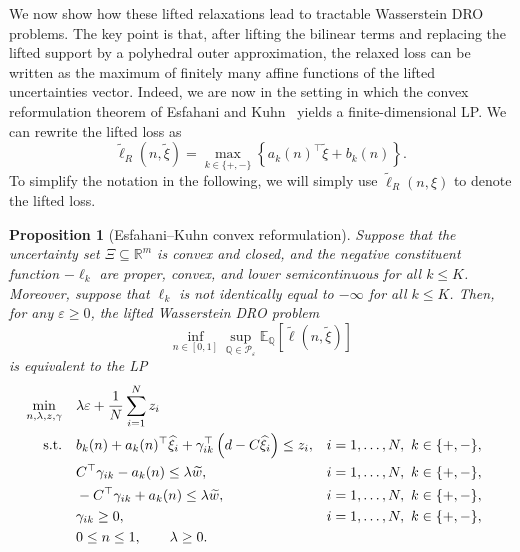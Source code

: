 \documentclass[11pt]{article}
\theoremstyle{plain}
\newtheorem{proposition}{Proposition}
\theoremstyle{definition}
\begin{document}
We now show how these lifted relaxations lead to tractable Wasserstein DRO problems. 
The key point is that, after lifting the bilinear terms and replacing the lifted support by a polyhedral outer approximation, the relaxed loss can be written as the maximum of finitely many affine functions of the lifted uncertainties vector. 
Indeed, we are now in the setting in which the convex reformulation theorem of Esfahani and Kuhn~\cite{EsfahaniKuhn2018} yields a finite-dimensional LP.
We can rewrite the lifted loss as
\begin{equation}\label{eq:max-affine-loss}
    \widetilde\ell_R(n,\widetilde\xi)
    =
    \max_{k\in\{+,-\}}
    \left\{
        a_k(n)^\top\widetilde\xi+b_k(n)
    \right\}.
\end{equation}
To simplify the notation in the following, we will simply use $\widetilde\ell_R(n,\xi)$ to denote the lifted loss.

\begin{proposition}[Esfahani--Kuhn convex reformulation]
\label{prop:convex-reformulation-kuhn}
Suppose that the uncertainty set $\Xi\subseteq\mathbb{R}^m$ is convex and closed, and the negative constituent function $-\ell_k$ are proper, convex, and lower semicontinuous for all $k\le K$. 
Moreover, suppose that $\ell_k$ is not identically equal to $-\infty$ for all $k\le K$.
Then, for any $\varepsilon\ge 0$, the lifted Wasserstein DRO problem
\[
    \inf_{n\in[0,1]}
    \sup_{\mathbb Q\in{\mathcal P}_{\varepsilon}}
    \mathbb E_{\mathbb Q}
    \left[
        \widetilde\ell(n,\widetilde\xi)
    \right]
\]
is equivalent to the LP
\begin{equation}
\label{eq:lifted-dro-lp}
\begin{aligned}
    \min_{n,\lambda,z,\gamma}\quad
    &
    \lambda\varepsilon+\frac1N\sum_{i=1}^N z_i
    \\
    \textnormal{s.t.}\quad
    &
    b_k(n)
    +
    a_k(n)^\top\widehat{\xi}_i
    +
    \gamma_{ik}^\top
    \left(
        d-C\widehat{\xi}_i
    \right)
    \le z_i,
    &&
    i=1,\ldots,N,\ k\in\{+,-\},
    \\
    &
    C^\top\gamma_{ik}-a_k(n)\le \lambda\widetilde w,
    &&
    i=1,\ldots,N,\ k\in\{+,-\},
    \\
    &
    -C^\top\gamma_{ik}+a_k(n)\le \lambda\widetilde w,
    &&
    i=1,\ldots,N,\ k\in\{+,-\},
    \\
    &
    \gamma_{ik}\ge0,
    &&
    i=1,\ldots,N,\ k\in\{+,-\},
    \\
    &
    0\le n\le1,
    \qquad
    \lambda\ge0 .
\end{aligned}
\end{equation}
\end{proposition}
\end{document}
